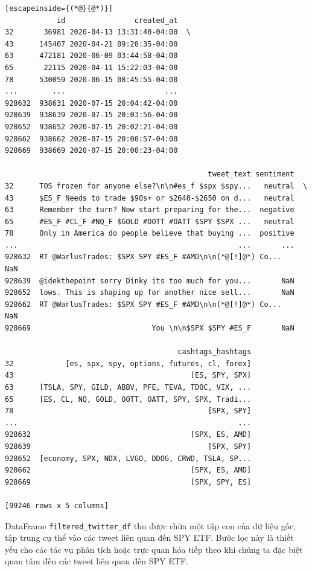\begin{lstlisting}[escapeinside={(*@}{@*)}]
            id                created_at   
32       36981 2020-04-13 13:31:40-04:00  \
43      145407 2020-04-21 09:20:35-04:00   
63      472181 2020-06-09 03:44:58-04:00   
65       22115 2020-04-11 15:22:03-04:00   
78      530059 2020-06-15 08:45:55-04:00   
...        ...                       ...   
928632  938631 2020-07-15 20:04:42-04:00   
928639  938639 2020-07-15 20:03:56-04:00   
928652  938652 2020-07-15 20:02:21-04:00   
928662  938662 2020-07-15 20:00:57-04:00   
928669  938669 2020-07-15 20:00:23-04:00   

                                               tweet_text sentiment   
32      TOS frozen for anyone else?\n\n#es_f $spx $spy...   neutral  \
43      $ES_F Needs to trade $90s+ or $2640-$2650 on d...   neutral   
63      Remember the turn? Now start preparing for the...  negative   
65      #ES_F #CL_F #NQ_F $GOLD #OOTT #OATT $SPY $SPX ...   neutral   
78      Only in America do people believe that buying ...  positive   
...                                                   ...       ...   
928632  RT @WarlusTrades: $SPX SPY #ES_F #AMD\n\n(*@[!]@*) Co...       NaN   
928639  @idekthepoint sorry Dinky its too much for you...       NaN   
928652  lows. This is shaping up for another nice sell...       NaN   
928662  RT @WarlusTrades: $SPX SPY #ES_F #AMD\n\n(*@[!]@*) Co...       NaN   
928669                            You \n\n$SPX $SPY #ES_F       NaN   

                                        cashtags_hashtags  
32            [es, spx, spy, options, futures, cl, forex]  
43                                         [ES, SPY, SPX]  
63      [TSLA, SPY, GILD, ABBV, PFE, TEVA, TDOC, VIX, ...  
65      [ES, CL, NQ, GOLD, OOTT, OATT, SPY, SPX, Tradi...  
78                                             [SPX, SPY]  
...                                                   ...  
928632                                     [SPX, ES, AMD]  
928639                                         [SPX, SPY]  
928652  [economy, SPX, NDX, LVGO, DDOG, CRWD, TSLA, SP...  
928662                                     [SPX, ES, AMD]  
928669                                     [SPX, SPY, ES]  

[99246 rows x 5 columns]
\end{lstlisting}

DataFrame \texttt{filtered\_twitter\_df} thu được chứa một tập con của dữ liệu gốc, tập trung cụ thể vào các tweet liên quan đến SPY ETF. Bước lọc này là thiết yếu cho các tác vụ phân tích hoặc trực quan hóa tiếp theo khi chúng ta đặc biệt quan tâm đến các tweet liên quan đến SPY ETF.

